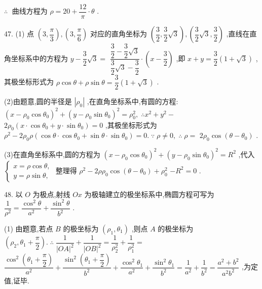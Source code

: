 $\therefore \;$ 曲线方程为 $\rho  = {20} + \dfrac{12}{\pi } \cdot  \theta$ .

47. (1) 点 $\left( {3,\dfrac{\pi }{3}}\right) ,\left( {3,\dfrac{\pi }{6}}\right)$ 对应的直角坐标为 $\left( {\dfrac{3}{2},\dfrac{3}{2}\sqrt{3}}\right) ,\left( {\dfrac{3}{2}\sqrt{3},\dfrac{3}{2}}\right)$ ,直线在直角坐标系中的方程为 $y - \dfrac{3}{2}\sqrt{3} =$  $\dfrac{\dfrac{3}{2} - \dfrac{3}{2}\sqrt{3}}{\dfrac{3}{2}\sqrt{3} - \dfrac{3}{2}} \cdot  \left( {x - \dfrac{3}{2}}\right)$ ,即 $x + y = \dfrac{3}{2}\left( {1 + \sqrt{3}}\right)$ ,其极坐标形式为 $\rho \cos \theta  + \rho \sin \theta  = \dfrac{3}{2}\left( {1 + \sqrt{3}}\right)$ .

(2)由题意,圆的半径是 $\left| {\rho }_{0}\right|$ ,在直角坐标系中,有圆的方程: ${\left( x - {\rho }_{0}\cos {\theta }_{0}\right) }^{2} + {\left( y - {\rho }_{0}\sin {\theta }_{0}\right) }^{2} = {\rho }_{0}^{2},\;\therefore {x}^{2} + {y}^{2} -$  $2{\rho }_{0}\left( {x \cdot  \cos {\theta }_{0} + y \cdot  \sin {\theta }_{0}}\right)  = 0$ ,其极坐标形式为 ${\rho }^{2} - 2{\rho }_{0}\rho \left( {\cos \theta  \cdot  \cos {\theta }_{0} + \sin \theta  \cdot  \sin {\theta }_{0}}\right)  = 0.\;\because \;\rho  \neq  0,\;\therefore \;\rho  =$  $2{\rho }_{0}\cos \left( {\theta  - {\theta }_{0}}\right)$ .

(3)在直角坐标系中,圆的方程为 ${\left( x - {\rho }_{0}\cos {\theta }_{0}\right) }^{2} + {\left( y - {\rho }_{0}\sin {\theta }_{0}\right) }^{2} = {R}^{2}$ ,代入 $\left\{  \begin{array}{l} x = \rho \cos \theta , \\  y = \rho \sin \theta , \end{array}\right.$ 整理得 ${\rho }^{2} - {2\rho }{\rho }_{0}\cos \left( {\theta  - {\theta }_{0}}\right)  + {\rho }_{0}^{2}$  $- {R}^{2} = 0$ .

48. 以 $O$ 为极点,射线 ${Ox}$ 为极轴建立的极坐标系中,椭圆方程可写为 $\dfrac{1}{{\rho }^{2}} = \dfrac{{\cos }^{2}\theta }{{a}^{2}} + \dfrac{{\sin }^{2}\theta }{{b}^{2}}$ .

(1) 由题意,若点 $B$ 的极坐标为 $\left( {{\rho }_{1},{\theta }_{1}}\right)$ ,则点 $A$ 的极坐标为 $\left( {{\rho }_{2},{\theta }_{1} + \dfrac{\pi }{2}}\right) .\;\therefore \;\dfrac{1}{{\left| OA\right| }^{2}} + \dfrac{1}{{\left| OB\right| }^{2}} = \dfrac{1}{{\rho }_{2}^{2}} + \dfrac{1}{{\rho }_{1}^{2}} =$  $\dfrac{{\cos }^{2}\left( {{\theta }_{1} + \dfrac{\pi }{2}}\right) }{{a}^{2}} + \dfrac{{\sin }^{2}\left( {{\theta }_{1} + \dfrac{\pi }{2}}\right) }{{b}^{2}} + \dfrac{{\cos }^{2}{\theta }_{1}}{{a}^{2}} + \dfrac{{\sin }^{2}{\theta }_{1}}{{b}^{2}} = \dfrac{1}{{a}^{2}} + \dfrac{1}{{b}^{2}} = \dfrac{{a}^{2} + {b}^{2}}{{a}^{2}{b}^{2}}$ ,为定值,证毕.

